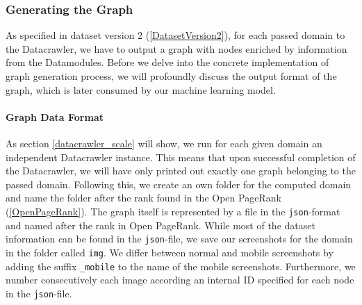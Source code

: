 \subsubsection{Generating the Graph}
\label{datacrawler_graph}
As specified in dataset version 2 (\ref{DatasetVersion2}), for each passed domain to the Datacrawler, we have to output a graph with nodes enriched by information from the Datamodules. Before we delve into the concrete implementation of graph generation process, we will profoundly discuss the output format of the graph, which is later consumed by our machine learning model.

\paragraph{Graph Data Format}
As section \ref{datacrawler_scale} will show, we run for each given domain an independent Datacrawler instance. This means that upon successful completion of the Datacrawler, we will have only printed out exactly one graph belonging to the passed domain. Following this, we create an own folder for the computed domain and name the folder after the rank found in the Open PageRank (\ref{OpenPageRank}). The graph itself is represented by a file in the \texttt{json}-format and named after the rank in Open PageRank. While most of the dataset information can be found in the \texttt{json}-file, we save our screenshots for the domain in the folder called \texttt{img}. We differ between normal and mobile screenshots by adding the suffix \texttt{\_mobile} to the name of the mobile screenshots. Furthermore, we number consecutively each image according an internal ID specified for each node in the \texttt{json}-file.

